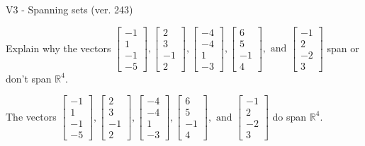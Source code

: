 \begin{exercise}
  \begin{exerciseTitle}V3 - Spanning sets (ver. 243)\end{exerciseTitle}
  \begin{exerciseStatement}
    Explain why the vectors \(\left[\begin{array}{r}
-1 \\
1 \\
-1 \\
-5
\end{array}\right] , \left[\begin{array}{r}
2 \\
3 \\
-1 \\
2
\end{array}\right] , \left[\begin{array}{r}
-4 \\
-4 \\
1 \\
-3
\end{array}\right] , \left[\begin{array}{r}
6 \\
5 \\
-1 \\
4
\end{array}\right] , \text{ and } \left[\begin{array}{r}
-1 \\
2 \\
-2 \\
3
\end{array}\right]\) span or don't span \(\mathbb{R}^4\). 
	


  \end{exerciseStatement}
  \begin{exerciseAnswer}
   The vectors \(\left[\begin{array}{r}
-1 \\
1 \\
-1 \\
-5
\end{array}\right] , \left[\begin{array}{r}
2 \\
3 \\
-1 \\
2
\end{array}\right] , \left[\begin{array}{r}
-4 \\
-4 \\
1 \\
-3
\end{array}\right] , \left[\begin{array}{r}
6 \\
5 \\
-1 \\
4
\end{array}\right] , \text{ and } \left[\begin{array}{r}
-1 \\
2 \\
-2 \\
3
\end{array}\right]\) 
  	 do  
	span \(\mathbb{R}^4\).
  



\end{exerciseAnswer}
\end{exercise}
